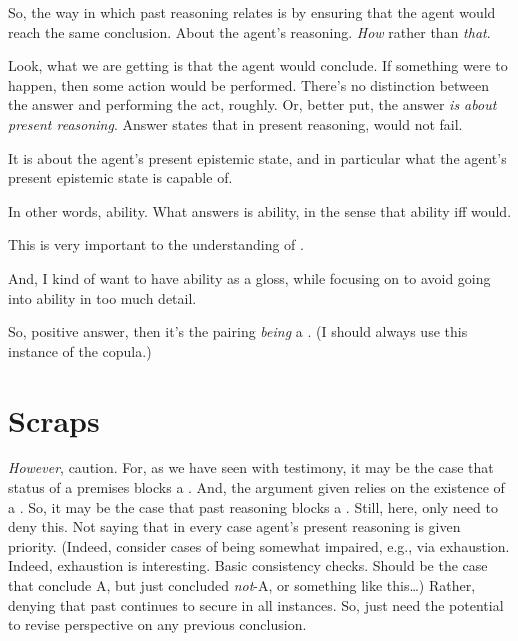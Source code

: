 \begin{note}
  So, the way in which past reasoning relates is by ensuring that the agent would reach the same conclusion.
  About the agent's reasoning.
  \emph{How} rather than \emph{that}.

  Look, what we are getting is that the agent would conclude.
  If something were to happen, then some action would be performed.
  There's no distinction between the answer and performing the act, roughly.
  Or, better put, the answer \emph{is about present reasoning}.
  Answer states that in present reasoning, would not fail.

  It is about the agent's present epistemic state, and in particular what the agent's present epistemic state is capable of.

  In other words, ability.
  What answers is ability, in the sense that ability iff would.

  This is very important to the understanding of \fc{}.

  And, I kind of want to have ability as a gloss, while focusing on \fc{} to avoid going into ability in too much detail.

  So, positive answer, then it's the pairing \emph{being} a \fc{}.
  (I should always use this instance of the copula.)
\end{note}

\section{Scraps}
\label{sec:scraps}

\begin{note}
  \emph{However}, caution.
  For, as we have seen with testimony, it may be the case that status of a premises blocks a \requ{}.
  And, the argument given relies on the existence of a \requ{}.
  So, it may be the case that past reasoning blocks a \requ{}.
  Still, here, only need to deny this.
  Not saying that in every case agent's present reasoning is given priority.
  (Indeed, consider cases of being somewhat impaired, e.g., via exhaustion.
  Indeed, exhaustion is interesting.
  Basic consistency checks.
  Should be the case that conclude A, but just concluded \emph{not}-A, or something like this\dots)
  Rather, denying that past continues to secure in all instances.
  So, just need the potential to revise perspective on any previous conclusion.
\end{note}



